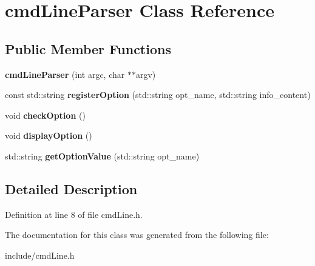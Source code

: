 \hypertarget{classcmd_line_parser}{\section{cmd\+Line\+Parser Class Reference}
\label{classcmd_line_parser}
}
\subsection*{Public Member Functions}
\begin{DoxyCompactItemize}
\item 
\hypertarget{classcmd_line_parser_a31192cbe35d9f370e66fcf6ccba7e19e}{{\bfseries cmd\+Line\+Parser} (int argc, char $\ast$$\ast$argv)}\label{classcmd_line_parser_a31192cbe35d9f370e66fcf6ccba7e19e}

\item 
\hypertarget{classcmd_line_parser_a698b2e34d8964aaa2fb79d9e6e74a75d}{const std\+::string {\bfseries register\+Option} (std\+::string opt\+\_\+name, std\+::string info\+\_\+content)}\label{classcmd_line_parser_a698b2e34d8964aaa2fb79d9e6e74a75d}

\item 
\hypertarget{classcmd_line_parser_a32905a58dee44f38ed173c6dfb04f7a5}{void {\bfseries check\+Option} ()}\label{classcmd_line_parser_a32905a58dee44f38ed173c6dfb04f7a5}

\item 
\hypertarget{classcmd_line_parser_a9797ce1197c69470e0126c6022a7157a}{void {\bfseries display\+Option} ()}\label{classcmd_line_parser_a9797ce1197c69470e0126c6022a7157a}

\item 
\hypertarget{classcmd_line_parser_a1bb3c03bbef3b08ab3836494971e2377}{std\+::string {\bfseries get\+Option\+Value} (std\+::string opt\+\_\+name)}\label{classcmd_line_parser_a1bb3c03bbef3b08ab3836494971e2377}

\end{DoxyCompactItemize}


\subsection{Detailed Description}


Definition at line 8 of file cmd\+Line.\+h.



The documentation for this class was generated from the following file\+:\begin{DoxyCompactItemize}
\item 
include/cmd\+Line.\+h\end{DoxyCompactItemize}
